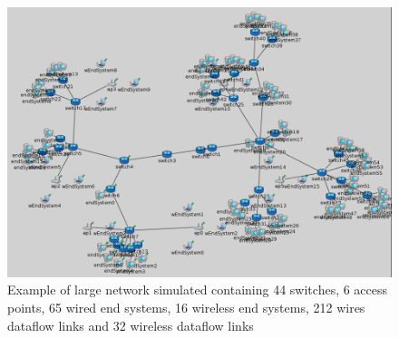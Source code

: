 \documentclass[conference]{IEEEtran}
\begin{document}
\begin{figure}[h]
	\centerline{\includegraphics[keepaspectratio=true, width=16cm] {figures/s1-3}}
	\caption{Example of large network simulated containing 44 switches, 6 access points, 65 wired end systems, 16 wireless end systems, 212 wires dataflow links and 32 wireless dataflow links}
	\label{fig:s1-3}
\end{figure}
\end{document}

